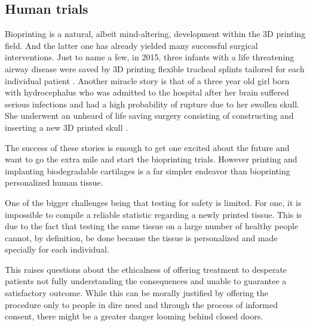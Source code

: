 \documentclass[12pt]{article} %
\begin{document}
\subsection{Human trials} %

Bioprinting is a natural, albeit mind-altering, development within the 3D printing field. And the latter one has already yielded many successful surgical interventions. Just to name a few, in 2015, three infants with a life threatening airway disease were saved by 3D printing flexible tracheal\footnotemark{} splints tailored for each individual patient \cite{Morrison:2015}.
Another miracle story is that of a three year old girl born with hydrocephalus\footnotemark{} who was admitted to the hospital after her brain suffered serious infections and had a high probability of rupture due to her swollen skull. She underwent an unheard of life saving surgery consisting of constructing and inserting a new 3D printed skull \cite{3dprint.com:2015}. 

The success of these stories is enough to get one excited about the future and want to go the extra mile and start the bioprinting trials. However printing and implanting biodegradable cartilages is a far simpler endeavor than bioprinting personalized human tissue. 

One of the bigger challenges being that testing for safety is limited. For one, it is impossible to compile a reliable statistic regarding a newly printed tissue. This is due to the fact that testing the same tissue on a large number of healthy people cannot, by definition, be done because the tissue is personalized and made specially for each individual.

This raises questions about the ethicalness of offering treatment to desperate patients not fully understanding the consequences and unable to guarantee a satisfactory outcome. While this can be morally justified by offering the procedure only to people in dire need and through the process of informed consent, there might be a greater danger looming behind closed doors. 
\end{document}
